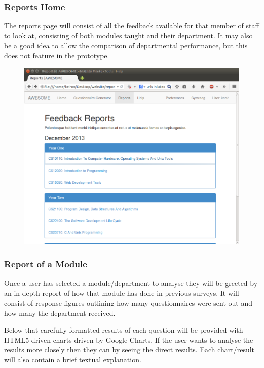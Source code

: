 \documentclass[11pt,a4paper]{article}
\begin{document}
\clearpage

\subsubsection{Reports Home}

The reports page will consist of all the feedback available for that member of staff to look at, consisting of both modules taught and their department. It may also be a good idea to allow the comparison of departmental performance, but this does not feature in the prototype.

\begin{figure}[hbtp]
\centering
\includegraphics[width=0.85\linewidth]{images/uidesign/reportshome.png}
\end{figure}

\clearpage

\subsubsection{Report of a Module}

Once a user has selected a module/department to analyse they will be greeted by an in-depth report of how that module has done in previous surveys. It will consist of response figures outlining how many questionnaires were sent out and how many the department received.

Below that carefully formatted results of each question will be provided with HTML5 driven charts driven by Google Charts. If the user wants to analyse the results more closely then they can by seeing the direct results. Each chart/result will also contain a brief textual explanation.
\end{document}
